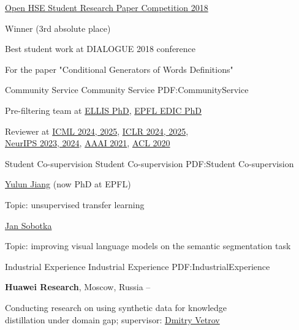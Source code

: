 \documentclass[letterpaper,MMMyyyy,nonstopmode]{simpleresumecv}
\begin{document}
\begin{Body}
\Entry
\href{https://nirs.hse.ru/nirs/}{Open HSE Student Research Paper Competition 2018}
\begin{Detail}
Winner (3rd absolute place)
\end{Detail}
\Gap

\Entry
Best student work at DIALOGUE 2018 conference
\begin{Detail}
For the paper "Conditional Generators of Words Definitions"
\end{Detail}

\newpage


\Section
{Community Service}
{Community Service}
{PDF:CommunityService}

\Entry
Pre-filtering team at \href{https://ellis.eu}{ELLIS PhD}, \href{https://www.epfl.ch/education/phd/edic-computer-and-communication-sciences/}{EPFL EDIC PhD}
\Gap

\Entry
Reviewer at \href{https://icml.cc}{ICML 2024, 2025}, \href{https://iclr.cc}{ICLR 2024, 2025}, \\
\href{https://neurips.cc}{NeurIPS 2023, 2024}, \href{https://aaai.org/Conferences/AAAI-21/}{AAAI 2021}, \href{https://acl2020.org}{ACL 2020}


\Section
{Student Co-supervision}
{Student Co-supervision}
{PDF:Student Co-supervision}

\Entry
\href{https://yljblues.github.io}{Yulun Jiang} (now PhD at EPFL)
\begin{Detail}
Topic: unsupervised transfer learning
\end{Detail}
\Gap

\Entry
\href{https://johnny1188.github.io}{Jan Sobotka}
\begin{Detail}
Topic: improving visual language models on the semantic segmentation task
\end{Detail}


\Section
{Industrial Experience}
{Industrial Experience}
{PDF:IndustrialExperience}

\Entry
\textbf{Huawei Research}, Moscow, Russia
\hfill
{} --
\begin{Detail}
Conducting research on using synthetic data for knowledge \\
distillation under domain gap; supervisor: \href{https://bayesgroup.ru/people/dmitry-vetrov/}{Dmitry Vetrov}
\end{Detail}
\Gap


\end{Body}
\end{document}
